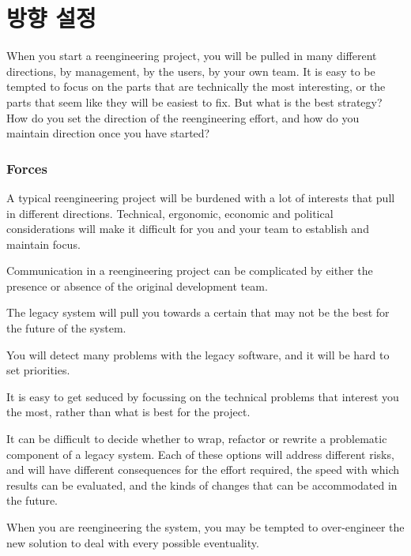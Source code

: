 \documentclass[a4paper,10pt,twoside]{book}
\begin{document}
	\renewcommand{\nnbb}[2]{} %
	\sloppy
\fi
\chapter{방향 설정}

When you start a reengineering project, you will be pulled in many different directions, by management, by the users, by your own team. It is easy to be tempted to focus on the parts that are technically the most interesting, or the parts that seem like they will be easiest to fix. But what is the best strategy? How do you set the direction of the reengineering effort, and how do you maintain direction once you have started?

\subsection*{Forces}
\begin{bulletlist}
  \item A typical reengineering project will be burdened with a lot of interests that pull in different directions. Technical, ergonomic, economic and political considerations will make it difficult for you and your team to establish and maintain focus. 

  \item Communication in a reengineering project can be complicated by either the presence or absence of the original development team.

  \item The legacy system will pull you towards a certain  that may not be the best for the future of the system.

  \item You will detect many problems with the legacy software, and it will be hard to set priorities.

  \item It is easy to get seduced by focussing on the technical problems that interest you the most, rather than what is best for the project.

  \item It can be difficult to decide whether to wrap, refactor or rewrite a problematic component of a legacy system. Each of these options will address different risks, and will have different consequences for the effort required, the speed with which results can be evaluated, and the kinds of changes that can be accommodated in the future.

  \item When you are reengineering the system, you may be tempted to over-engineer the new solution to deal with every possible eventuality.
\end{bulletlist}
\end{document}

